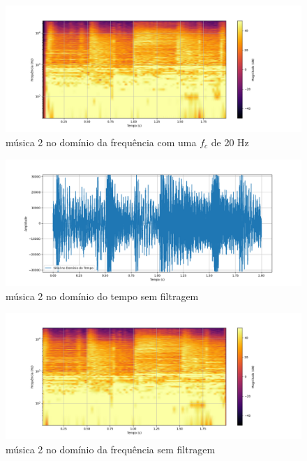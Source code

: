 \begin{anexosenv}
\begin{figure}[h]
	\centering
    \includegraphics[width=\textwidth]{figuras/fig39.png}
	\caption{música 2 no domínio da frequência com uma $f_c$ de 20 Hz}
	\label{fig39}
\end{figure}

\begin{figure}[h]
	\centering
    \includegraphics[width=\textwidth]{figuras/fig42.png}
	\caption{música 2 no domínio do tempo sem filtragem}
	\label{fig42}
\end{figure}

\begin{figure}[h]
	\centering
    \includegraphics[width=\textwidth]{figuras/fig43.png}
	\caption{música 2 no domínio da frequência sem filtragem}
	\label{fig43}
\end{figure}

\end{anexosenv}